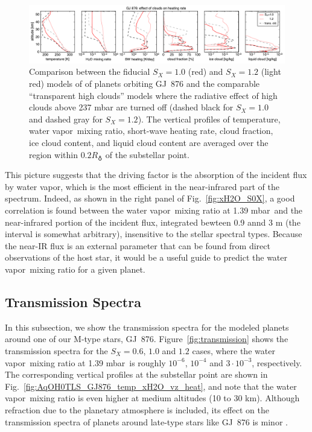 \documentclass[11pt,numberedappendix,twocolappendix,]{emulateapj}
\def\preslevel{1.39 mbar\ }
\newcommand{\wv}{{\color{orange}water vapor\ }}
\begin{document}
\begin{figure}[htb]
    \begin{center}
    \includegraphics[width=1\hsize]{fig/GJ876_heat_cld.pdf}
    \end{center}
\caption{Comparison between the fiducial $S_X=1.0$ (red) and $S_X=1.2$ (light red) models of of planets orbiting GJ~876 and the comparable ``transparent high clouds'' models where the radiative effect of high clouds above 237 mbar are turned off (dashed black for $S_X=1.0$ and dashed gray for $S_X=1.2$). The vertical profiles of temperature, \wv mixing ratio, short-wave heating rate, cloud fraction, ice cloud content, and liquid cloud content are averaged over the region within $0.2R_\earth$ of the substellar point. }
\label{fig:GJ876_heat_cld}
\end{figure}

This picture suggests that the driving factor is the absorption of the incident flux by water vapor, which is the most efficient in the near-infrared part of the spectrum. 
Indeed, as shown in the right panel of Fig.~\ref{fig:xH2O_S0X}, a good correlation is found between the \wv mixing ratio at \preslevel and the near-infrared portion of the incident flux, integrated bewteen 0.9 annd 3 \textmu m (the interval is somewhat arbitrary), insensitive to the stellar spectral types. 
Because the near-IR flux is an external parameter that can be found from direct observations of the host star, it would be a useful guide to predict the \wv  mixing ratio for a given planet. 


\subsection{Transmission Spectra}
\label{ss:result_TransmissionSpectra}

In this subsection, we show the transmission spectra for the modeled planets around one of our M-type stars, GJ~876. 
Figure~\ref{fig:transmission} shows the transmission spectra for the $S_X=0.6$, $1.0$ and $1.2$ cases, where the \wv mixing ratio at \preslevel is roughly $10^{-6}$, $10^{-4}$ and $3\cdot 10^{-3}$, respectively. 
The corresponding vertical profiles at the substellar point are shown in Fig.~\ref{fig:AqOH0TLS_GJ876_temp_xH2O_vz_heat}, and note that the \wv mixing ratio is even higher at medium altitudes (10 to 30 km).
Although refraction due to the planetary atmosphere is included, its effect on the transmission spectra of planets around late-type stars like GJ~876 is minor \citep{Betremieux2014,Misra2014}. 
\end{document}
